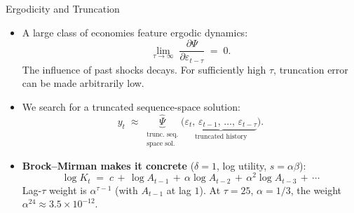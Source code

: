 \documentclass[aspectratio=169,11pt]{beamer}
\newcommand{\emphc}[1]{\textcolor{harvardcrimson}{#1}}
\begin{document}
\begin{frame}{Ergodicity and Truncation}
\small
\begin{itemize}\itemsep10pt
\item A large class of economies feature \emphc{ergodic dynamics}:
\[
\lim_{\tau \to \infty}\;\frac{\partial \Psi}{\partial \varepsilon_{t-\tau}} \;=\; 0.
\]
The influence of past shocks decays.  For sufficiently high $\tau$, truncation error can be made arbitrarily low.

\item We search for a \emphc{truncated} sequence-space solution:
\[
y_t \;\approx\; \underbrace{\widehat\Psi}_{\substack{\text{trunc.\ seq.}\\ \text{space sol.}}}\!\bigl(\underbrace{\varepsilon_t,\,\varepsilon_{t-1},\,\ldots,\,\varepsilon_{t-\tau}}_{\text{truncated history}}\bigr).
\]

\item \textbf{Brock--Mirman makes it concrete} ($\delta = 1$, log utility, $s = \alpha\beta$):
\[
\log K_t \;=\; c \,+\, \log A_{t-1} \,+\, \alpha \log A_{t-2} \,+\, \alpha^2 \log A_{t-3} \,+\, \cdots
\]
Lag-$\tau$ weight is $\alpha^{\tau-1}$ (with $A_{t-1}$ at lag $1$).  At $\tau = 25$, $\alpha = 1/3$, the weight $\alpha^{24} \approx 3.5\!\times\!10^{-12}$.
\end{itemize}
\end{frame}


\end{document}
